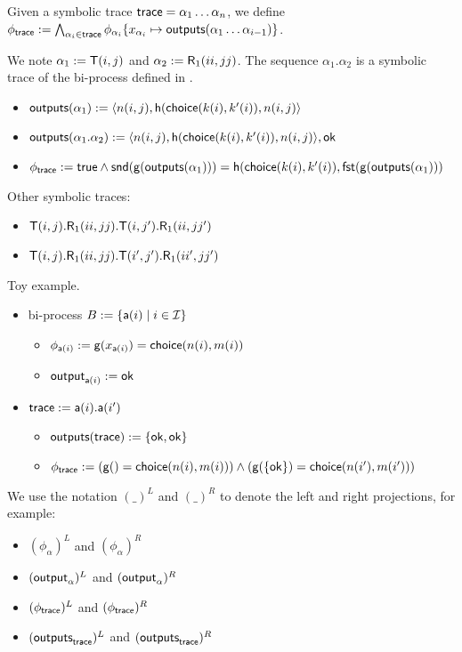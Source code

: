 \begin{definition}
  Given a symbolic trace $\textsf{trace} = \alpha_1 \dots \alpha_n$, we define $\phi_{\textsf{trace}} := \bigwedge_{\alpha_i\in\textsf{trace}} \phi_{\alpha_i}\{x_{\alpha_i}\mapsto\textsf{outputs}(\alpha_1 \dots \alpha_{i-1})\}$.
\end{definition}

\begin{example}
  \label{ex:basic-hash-trace}
  We note $\alpha_1 := \textsf{T}(i,j)$ and $\alpha_2 := \textsf{R}_1(ii,jj)$.
  The sequence $\alpha_1.\alpha_2$ is a symbolic trace of the bi-process defined in .
  \begin{itemize}
    \item $\textsf{outputs}(\alpha_1) := \langle n(i,j), \mathsf{h}(\mathsf{choice}(k(i),k'(i)),n(i,j) \rangle$
    \item $\textsf{outputs}(\alpha_1.\alpha_2) := \langle n(i,j), \mathsf{h}(\mathsf{choice}(k(i),k'(i)),n(i,j) \rangle, \mathsf{ok}$
    \item $\phi_{\textsf{trace}} := \textsf{true} \land \mathsf{snd}(\mathsf{g}(\textsf{outputs}(\alpha_1))) = \mathsf{h}(\mathsf{choice}(k(i),k'(i)),\mathsf{fst}(\mathsf{g}(\textsf{outputs}(\alpha_1)))$
  \end{itemize}
  Other symbolic traces:
  \begin{itemize}
    \item $\textsf{T}(i,j).\textsf{R}_1(ii,jj).\textsf{T}(i,j').\textsf{R}_1(ii,jj')$
    \item $\textsf{T}(i,j).\textsf{R}_1(ii,jj).\textsf{T}(i',j').\textsf{R}_1(ii',jj')$
  \end{itemize}
\end{example}

\begin{example}
  Toy example.
  \begin{itemize}
    \item bi-process $B := \{ \textsf{a}(i) \mid i \in \mathcal{I} \}$
      \begin{itemize}
        \item $\phi_{\textsf{a}(i)} := \mathsf{g}(x_{\textsf{a}(i)}) = \mathsf{choice}(n(i),m(i))$
        \item $\textsf{output}_{\textsf{a}(i)} := \mathsf{ok}$
      \end{itemize}
    \item $\textsf{trace} := \textsf{a}(i).\textsf{a}(i')$
    \begin{itemize}
      \item $\textsf{outputs}(\textsf{trace}) := \{\mathsf{ok},\mathsf{ok}\}$
      \item $\phi_{\textsf{trace}} := (\mathsf{g}() = \mathsf{choice}(n(i),m(i))) \land (\mathsf{g}(\{\mathsf{ok}\}) = \mathsf{choice}(n(i'),m(i')))$
    \end{itemize}
  \end{itemize}
\end{example}

\bigskip
\noindent
We use the notation $(\_)^L$ and $(\_)^R$ to denote the left and right projections, for example:
\begin{itemize}
  \item $(\phi_{\alpha})^L$ and $(\phi_{\alpha})^R$
  \item $(\textsf{output}_{\alpha})^L$ and $(\textsf{output}_{\alpha})^R$
  \item $(\phi_{\textsf{trace}})^L$ and $(\phi_{\textsf{trace}})^R$
  \item $(\textsf{outputs}_{\textsf{trace}})^L$ and $(\textsf{outputs}_{\textsf{trace}})^R$
\end{itemize}
